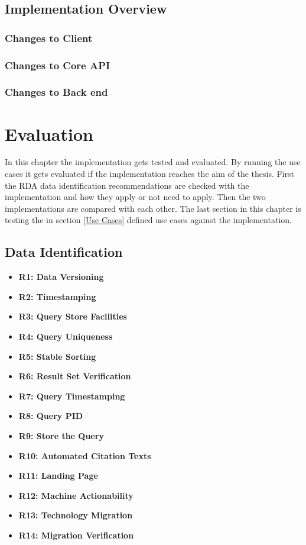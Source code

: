 \documentclass[draft,final]{vutinfth} %
\begin{document}

\section{Implementation Overview}\label{Implementation Overview}

\subsection{Changes to Client}
\subsection{Changes to Core API}
\subsection{Changes to Back end}

\chapter{Evaluation}\label{Evaluation}
In this chapter the implementation gets tested and evaluated. By running the use cases it gets evaluated if the implementation reaches the aim of the thesis. First the RDA data identification recommendations are checked with the implementation and how they apply or not need to apply. Then the two implementations are compared with each other. The last section in this chapter is testing the in section \ref{Use Cases} defined use cases against the implementation. 

\section{Data Identification}\label{Evaluation:Data Identification}

\begin{itemize}
	\item \textbf{R1: Data Versioning}
	\item \textbf{R2: Timestamping}
	\item \textbf{R3: Query Store Facilities}
	\item \textbf{R4: Query Uniqueness}
	\item \textbf{R5: Stable Sorting}
	\item \textbf{R6: Result Set Verification}
	\item \textbf{R7: Query Timestamping}
	\item \textbf{R8: Query PID}
	\item \textbf{R9: Store the Query}
	\item \textbf{R10: Automated Citation Texts}
	\item \textbf{R11: Landing Page}
	\item \textbf{R12: Machine Actionability}
	\item \textbf{R13: Technology Migration}
	\item \textbf{R14: Migration Verification}
\end{itemize}
\end{document}
